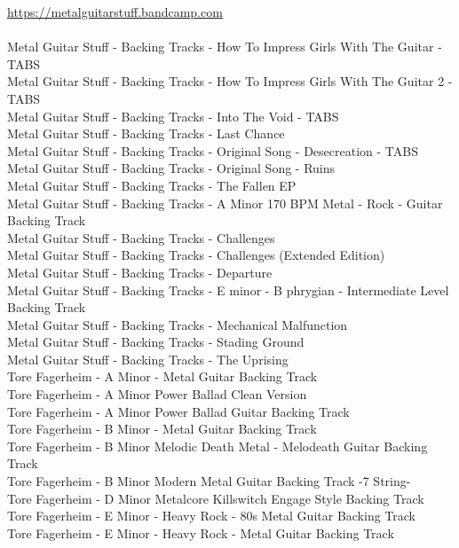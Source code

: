 \url*{https://metalguitarstuff.bandcamp.com}\\
\ \\
Metal Guitar Stuff - Backing Tracks - How To Impress Girls With The Guitar - TABS\\
Metal Guitar Stuff - Backing Tracks - How To Impress Girls With The Guitar 2 - TABS\\
Metal Guitar Stuff - Backing Tracks - Into The Void - TABS\\
Metal Guitar Stuff - Backing Tracks - Last Chance\\
Metal Guitar Stuff - Backing Tracks - Original Song - Desecreation - TABS\\
Metal Guitar Stuff - Backing Tracks - Original Song - Ruins\\
Metal Guitar Stuff - Backing Tracks - The Fallen EP\\
Metal Guitar Stuff - Backing Tracks - A Minor 170 BPM Metal - Rock - Guitar Backing Track\\
Metal Guitar Stuff - Backing Tracks - Challenges\\
Metal Guitar Stuff - Backing Tracks - Challenges (Extended Edition)\\
Metal Guitar Stuff - Backing Tracks - Departure\\
Metal Guitar Stuff - Backing Tracks - E minor - B phrygian - Intermediate Level Backing Track\\
Metal Guitar Stuff - Backing Tracks - Mechanical Malfunction\\
Metal Guitar Stuff - Backing Tracks - Stading Ground\\
Metal Guitar Stuff - Backing Tracks - The Uprising\\
Tore Fagerheim - A Minor - Metal Guitar Backing Track\\
Tore Fagerheim - A Minor Power Ballad Clean Version\\
Tore Fagerheim - A Minor Power Ballad Guitar Backing Track\\
Tore Fagerheim - B Minor - Metal Guitar Backing Track\\
Tore Fagerheim - B Minor Melodic Death Metal - Melodeath Guitar Backing Track\\
Tore Fagerheim - B Minor Modern Metal Guitar Backing Track -7 String-\\
Tore Fagerheim - D Minor Metalcore Killswitch Engage Style Backing Track\\
Tore Fagerheim - E Minor - Heavy Rock - 80s Metal Guitar Backing Track\\
Tore Fagerheim - E Minor - Heavy Rock - Metal Guitar Backing Track\\
